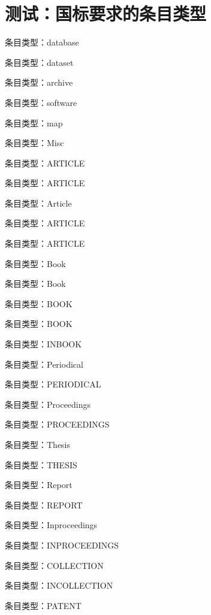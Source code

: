 

    \section{测试：国标要求的条目类型}
    \begin{refsection}
    条目类型：database\cite{databaseeg}

条目类型：dataset\cite{dataseteg}

条目类型：archive\cite{archiveeg}

条目类型：software\cite{softwareeg}

条目类型：map\cite{mapeg}

条目类型：Misc\cite{Misceg}

条目类型：ARTICLE\cite{aritileeg}

条目类型：ARTICLE\cite{方军雄2007所有制}

条目类型：Article\cite{abx2007-500-503}

条目类型：ARTICLE\cite{杨洪升2013-56-75}

条目类型：ARTICLE\cite{丁文祥2000--}

条目类型：Book\cite{Yi2014--}

条目类型：Book\cite{Yi2013--}

条目类型：BOOK\cite{张伯伟2002--}

条目类型：BOOK\cite{国家环境保护局科技标准司1996-2-3}

条目类型：INBOOK\cite{白书农1998-146-163}

条目类型：Periodical\cite{AAAS1883--}

条目类型：PERIODICAL\cite{中华医学会湖北分会1984--}

条目类型：Proceedings\cite{ROSENTHALL1963--}

条目类型：PROCEEDINGS\cite{雷光春2012--}

条目类型：Thesis\cite{CALMS1965--}

条目类型：THESIS\cite{马欢2011-27-27}

条目类型：Report\cite{WHO1970--}

条目类型：REPORT\cite{汤万金2013-09-30--}

条目类型：Inproceedings\cite{FOURNEY1971-17-38}

条目类型：INPROCEEDINGS\cite{贾东琴2011-45-52}

条目类型：COLLECTION\cite{中国职工教育研究会1985--}

条目类型：INCOLLECTION\cite{韩吉人1985-90-99}

条目类型：PATENT\cite{张凯军2012-04-05--}

    \printbibliography
    \end{refsection}



